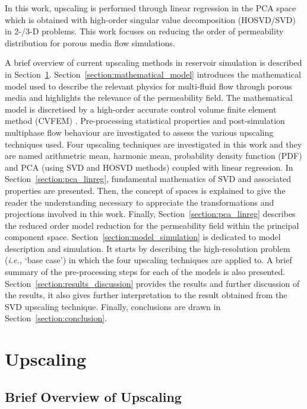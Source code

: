 \documentclass[preprint,12pt]{elsarticle}
\newcommand{\ie}{{\it i.e., }}
\begin{document}
\bigskip
 In this work, upscaling is performed through linear regression in the PCA space which is obtained with high-order singular value decomposition (HOSVD/SVD) in 2-/3-D problems. This work focuses on reducing the order of permeability distribution for porous media flow simulations. 

\bigskip
A brief overview of current upscaling methods in reservoir simulation is described in Section~\ref{section:general_upscaling}. Section~\ref{section:mathematical_model} introduces the mathematical model used to describe the relevant physics for multi-fluid flow through porous media and highlights the relevance of the permeability field. The mathematical model is discretised by a high-order accurate control volume finite element method (CVFEM) \cite{Gomes_2017}. Pre-processing statistical properties and post-simulation multiphase flow behaviour are investigated to assess the various upscaling techniques used. Four upscaling techniques are investigated in this work and they are named arithmetric mean, harmonic mean, probability density function (PDF) and PCA (using SVD and HOSVD methods) coupled with linear regression. In Section~\ref{section:pca_linreg}, fundamental mathematics of SVD and associated properties are presented. Then, the concept of spaces is explained to give the reader the understanding necessary to appreciate the transformations and projections involved in this work. Finally, Section~\ref{section:pca_linreg} describes the reduced order model reduction for the permeability field within the principal component space. Section~\ref{section:model_simulation} is dedicated to model description and simulation. It starts by describing the high-resolution problem (\ie `base case') in which the four upscaling techniques are applied to. A brief summary of the pre-processing steps for each of the models is also presented. Section~\ref{section:results_discussion} provides the results and further discussion of the results, it also gives further interpretation to the result obtained from the SVD upscaling technique. Finally, conclusions are drawn in Section~\ref{section:conclusion}.


\section{Upscaling}\label{section:general_upscaling}
\subsection{Brief Overview of Upscaling}\label{section:overview_upscaling}
\end{document}

